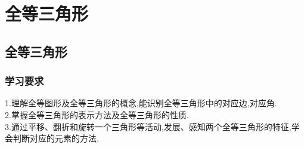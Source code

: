 \documentclass[14pt,UTF-8,a4paper,titlepage]{ctexbook}
\begin{document}
\chapter{全等三角形}
\section{全等三角形}
\subsection{学习要求}
1.理解全等图形及全等三角形的概念,能识别全等三角形中的对应边,对应角.\\
2.掌握全等三角形的表示方法及全等三角形的性质.\\
3.通过平移、翻折和旋转一个三角形等活动,发展、感知两个全等三角形的特征,学会判断对应的元素的方法.\\
\end{document}

